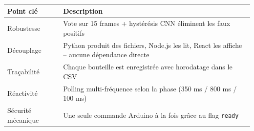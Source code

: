 \documentclass[11pt,a4paper]{article}
\begin{document}
\begin{center}
\begin{tabular}{p{4cm} p{9.5cm}}
\toprule
\textbf{Point clé} & \textbf{Description} \\
\midrule
Robustesse          & Vote sur 15 frames + hystérésis CNN éliminent les faux positifs \\
Découplage          & Python produit des fichiers, Node.js les lit, React les affiche
                      -- aucune dépendance directe \\
Traçabilité         & Chaque bouteille est enregistrée avec horodatage dans le CSV \\
Réactivité          & Polling multi-fréquence selon la phase (350 ms / 800 ms / 100 ms) \\
Sécurité mécanique  & Une seule commande Arduino à la fois grâce au flag \texttt{ready} \\
\bottomrule
\end{tabular}
\end{center}
\end{document}
